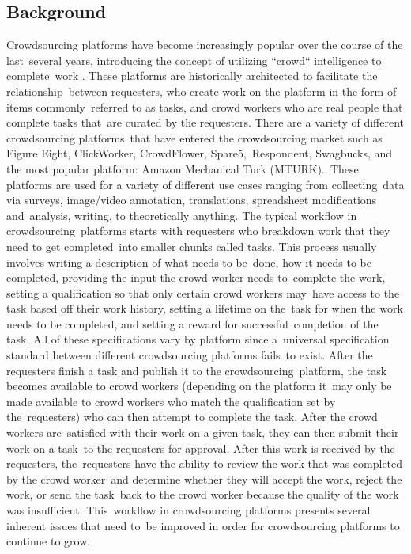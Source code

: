 \documentclass[letterpaper,12pt]{article}
\begin{document}
\subsection{Background}
Crowdsourcing platforms have become increasingly popular over the course of the last\ 
several years, introducing the concept of utilizing ``crowd`` intelligence to complete\
work \cite{kuek2015global}. These platforms are historically architected to facilitate the relationship\ 
between requesters, who create work on the platform in the form of items commonly\ 
referred to as tasks, and crowd workers who are real people that complete tasks that\ 
are curated by the requesters. There are a variety of different crowdsourcing platforms\ 
that have entered the crowdsourcing market such as Figure Eight, ClickWorker, CrowdFlower, Spare5,\ 
Respondent, Swagbucks, and the most popular platform: Amazon Mechanical Turk (MTURK).\ 
These platforms are used for a variety of different use cases ranging from collecting\
data via surveys, image/video annotation, translations, spreadsheet modifications and\ 
analysis, writing, to theoretically anything. The typical workflow in crowdsourcing\ 
platforms starts with requesters who breakdown work that they need to get completed\ 
into smaller chunks called tasks. This process usually involves writing a description of what needs to be\ 
done, how it needs to be completed, providing the input the crowd worker needs to\ 
complete the work, setting a qualification so that only certain crowd workers may\ 
have access to the task based off their work history, setting a lifetime on the\ 
task for when the work needs to be completed, and setting a reward for successful\ 
completion of the task. All of these specifications vary by platform since a\ 
universal specification standard between different crowdsourcing platforms fails\ 
to exist. \cite{allahbakhsh2013quality} After the requesters finish a task and publish it to the crowdsourcing\ 
platform, the task becomes available to crowd workers (depending on the platform it\ 
may only be made available to crowd workers who match the qualification set by the\ 
requesters) who can then attempt to complete the task. After the crowd workers are\ 
satisfied with their work on a given task, they can then submit their work on a task\ 
to the requesters for approval. After this work is received by the requesters, the\ 
requesters have the ability to review the work that was completed by the crowd worker\
and determine whether they will accept the work, reject the work, or send the task\ 
back to the crowd worker because the quality of the work was insufficient. This\ 
workflow in crowdsourcing platforms presents several inherent issues that need to\ 
be improved in order for crowdsourcing platforms to continue to grow.
\end{document}

